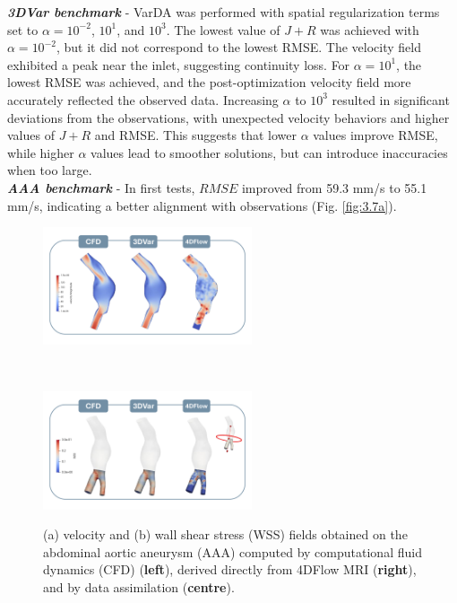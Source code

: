 \textbf{\textit{3DVar benchmark}} - VarDA was performed with spatial regularization terms set to $\alpha = 10^{-2}$, $10^1$, and $10^3$. The lowest value of $J + R$ was achieved with $\alpha = 10^{-2}$, but it did not correspond to the lowest RMSE. The velocity field exhibited a peak near the inlet, suggesting continuity loss. For $\alpha = 10^1$, the lowest RMSE was achieved, and the post-optimization velocity field more accurately reflected the observed data. Increasing $\alpha$ to $10^3$ resulted in significant deviations from the observations, with unexpected velocity behaviors and higher values of $J + R$ and RMSE. This suggests that lower $\alpha$ values improve RMSE, while higher $\alpha$ values lead to smoother solutions, but can introduce inaccuracies when too large.\\


\textbf{\textit{AAA benchmark}} - In first tests, \(RMSE\) improved from 59.3 mm/s to 55.1 mm/s, indicating a better alignment with observations (Fig. \ref{fig:3.7a}). 
\begin{figure}
    \centering
    \begin{minipage}{\textwidth}
        \centering
        \includegraphics[width=0.55\textwidth, height = 0.2\textheight]{chapters/paratico/Fig1.3a.pdf}
        \label{fig:3.7a}
    \end{minipage}
    \\[1em]  
    \begin{minipage}{\textwidth}
        \centering
        \includegraphics[width=0.55\textwidth, height = 0.2\textheight]{chapters/paratico/Fig1.3b.pdf}
        \label{fig:3.7b}
    \end{minipage}
    \caption{\small (a) velocity and (b) wall shear stress (WSS) fields obtained on the abdominal aortic aneurysm (AAA) computed by computational fluid dynamics (CFD) (\textbf{left}), derived directly from 4DFlow MRI (\textbf{right}), and by  data assimilation (\textbf{centre}).}
    \label{fig:3.7}
\end{figure}

